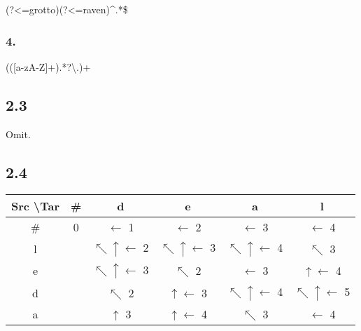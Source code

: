 \documentclass{article}
\begin{document}
(?<=grotto)(?<=raven)\^{}.*\$

\subsubsection*{4.}

(([a-zA-Z]+).*?\textbackslash.)+

\subsection*{2.3}

Omit.

\subsection*{2.4}

\begin{center}
    \begin{tabular}{| c | c | c | c | c | c | }
        \hline
        Src \textbackslash Tar & \#             & d                                & e                                & a                                & l                                \\
        \hline
        \#                     & 0              & $\leftarrow$ 1                   & $\leftarrow$ 2                   & $\leftarrow$ 3                   & $\leftarrow$ 4                   \\
        \hline
        l                      & \textuparrow 1 & $\nwarrow \uparrow \leftarrow$ 2 & $\nwarrow \uparrow \leftarrow$ 3 & $\nwarrow \uparrow \leftarrow$ 4 & $\nwarrow$ 3                     \\
        \hline
        e                      & \textuparrow 2 & $\nwarrow \uparrow \leftarrow$ 3 & $\nwarrow$ 2                     & $\leftarrow$ 3                   & $\uparrow \leftarrow$ 4          \\
        \hline
        d                      & \textuparrow 3 & $\nwarrow$ 2                     & $\uparrow \leftarrow$ 3          & $\nwarrow \uparrow \leftarrow$ 4 & $\nwarrow \uparrow \leftarrow$ 5 \\
        \hline
        a                      & \textuparrow 4 & $\uparrow$ 3                     & $\uparrow \leftarrow$ 4          & $\nwarrow$ 3                     & $\leftarrow$ 4                   \\
        \hline
    \end{tabular}
\end{center}
\end{document}
